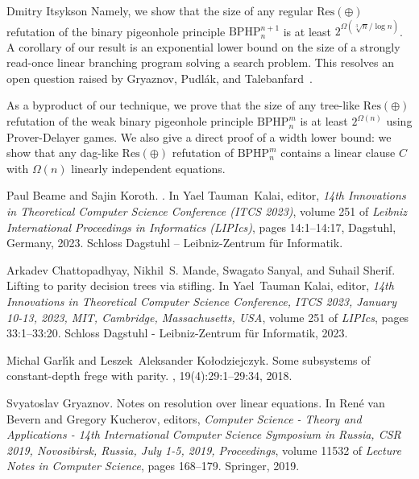 \documentclass[report]{owrart}
\newcommand{\resoplus}{\mathrm{Res}(\oplus)}
\newcommand{\BPHP}{\mathrm{BPHP}}
\begin{document}
\begin{report}
\begin{talk}{Dmitry Itsykson}
Namely, we show that the size of any regular $\resoplus$ refutation of the binary pigeonhole principle $\BPHP^{n+1}_{n}$ is at least $2^{\Omega(\sqrt[3]{n}/\log n)}$. A corollary of our result is an exponential lower bound on the size of a strongly read-once linear branching program solving a search problem. This resolves an open question raised by Gryaznov, Pudl\'{a}k, and Talebanfard~\cite{GryaznovPT22}.

As a byproduct of our technique, we prove that the size of any tree-like $\resoplus$ refutation of the weak binary pigeonhole principle $\BPHP^{m}_{n}$ is at least $2^{\Omega(n)}$ using Prover-Delayer games. We also give a direct proof of a width lower bound: we show that any dag-like $\resoplus$ refutation of $\BPHP^{m}_{n}$ contains a linear clause $C$ with $\Omega(n)$ linearly independent equations.
  
      \begin{thebibliography}{99}
      
Paul Beame and Sajin Koroth.
.
\newblock In Yael Tauman~Kalai, editor, {\em 14th Innovations in Theoretical
  Computer Science Conference (ITCS 2023)}, volume 251 of {\em Leibniz
  International Proceedings in Informatics (LIPIcs)}, pages 14:1--14:17,
  Dagstuhl, Germany, 2023. Schloss Dagstuhl -- Leibniz-Zentrum f{\"u}r
  Informatik.

Arkadev Chattopadhyay, Nikhil~S. Mande, Swagato Sanyal, and Suhail Sherif.
\newblock Lifting to parity decision trees via stifling.
\newblock In Yael~Tauman Kalai, editor, {\em 14th Innovations in Theoretical
  Computer Science Conference, {ITCS} 2023, January 10-13, 2023, MIT,
  Cambridge, Massachusetts, {USA}}, volume 251 of {\em LIPIcs}, pages
  33:1--33:20. Schloss Dagstuhl - Leibniz-Zentrum f{\"{u}}r Informatik, 2023.

Michal Garl{\'{\i}}k and Leszek~Aleksander Ko\l{}odziejczyk.
\newblock Some subsystems of constant-depth frege with parity.
, 19(4):29:1--29:34, 2018.

Svyatoslav Gryaznov.
\newblock Notes on resolution over linear equations.
\newblock In Ren{\'{e}} van Bevern and Gregory Kucherov, editors, {\em Computer
  Science - Theory and Applications - 14th International Computer Science
  Symposium in Russia, {CSR} 2019, Novosibirsk, Russia, July 1-5, 2019,
  Proceedings}, volume 11532 of {\em Lecture Notes in Computer Science}, pages
  168--179. Springer, 2019.


\end{thebibliography}
\end{talk}
\end{report}
\end{document}
